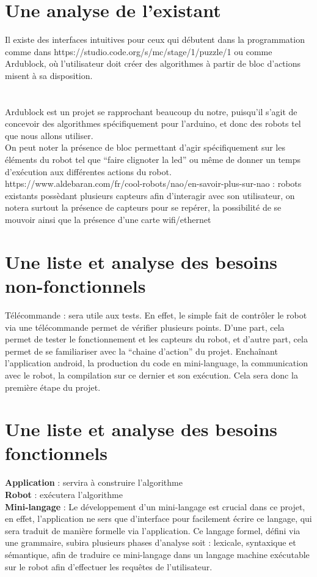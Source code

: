 \documentclass[a4paper]{article}
\begin{document}
\section{Une analyse de l’existant}
Il existe des interfaces intuitives pour ceux qui débutent dans la programmation comme dans https://studio.code.org/s/mc/stage/1/puzzle/1 ou comme Ardublock, où l’utilisateur doit créer des algorithmes à partir de bloc d’actions misent à sa disposition.\\
\\ \\
Ardublock est un projet se rapprochant beaucoup du notre, puisqu’il s’agit de concevoir des algorithmes spécifiquement pour l’arduino, et donc des robots tel que nous allons utiliser. \\
On peut noter la présence de bloc permettant d’agir spécifiquement sur les éléments du robot tel que “faire clignoter la led” ou même de donner un temps d'exécution aux différentes actions du robot.\\

https://www.aldebaran.com/fr/cool-robots/nao/en-savoir-plus-sur-nao : robots existants possèdant plusieurs capteurs afin d’interagir avec son utilisateur, on notera surtout la présence de capteurs pour se repérer, la possibilité de se mouvoir ainsi que la présence d’une carte wifi/ethernet
\section{Une liste et analyse des besoins non-fonctionnels}
Télécommande : sera utile aux tests. En effet, le simple fait de contrôler le robot via une télécommande permet de vérifier plusieurs points. D’une part, cela permet de tester le fonctionnement et les capteurs du robot, et d’autre part, cela permet de se familiariser avec la “chaine d’action” du projet. Enchaînant l’application android, la production du code en mini-language, la communication avec le robot, la compilation sur ce dernier et son exécution. Cela sera donc la première étape du projet.
\section{Une liste et analyse des besoins fonctionnels}
\textbf{Application} : servira à construire l’algorithme\\
\textbf{Robot} : exécutera l’algorithme\\
\textbf{Mini-langage }: Le développement d’un mini-langage est crucial dans ce projet, en effet, l’application ne sers que d’interface pour facilement écrire ce langage, qui sera traduit de manière formelle via l’application. Ce langage formel, défini via une grammaire, subira plusieurs phases d’analyse soit : lexicale, syntaxique et sémantique, afin de traduire ce mini-langage dans un langage machine exécutable sur le robot afin d’effectuer les requêtes de l’utilisateur.
\end{document}
